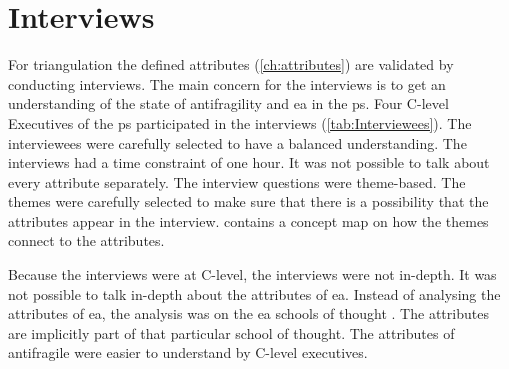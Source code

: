 \chapter{Interviews}
\label{ch:interviews}
For triangulation the defined \glspl{attribute} (\cref{ch:attributes}) are validated by conducting interviews. The main concern for the interviews is to get an understanding of the state of \gls{antifragility} and \acrshort{ea} in the \gls{ps}. Four C-level Executives of the \gls{ps} participated in the interviews (\cref{tab:Interviewees}). The interviewees were carefully selected to have a balanced understanding. The interviews had a time constraint of one hour. It was not possible to talk about every \gls{attribute} separately. The interview questions were theme-based. The themes were carefully selected to make sure that there is a possibility that the \glspl{attribute} appear in the interview.  contains a concept map on how the themes connect to the \glspl{attribute}.
\begin{table}[H]
	\centering
	\caption[Interviewees]{Interviewees}%
	\label{tab:Interviewees}%
\end{table}
Because the interviews were at C-level, the interviews were not in-depth. It was not possible to talk in-depth about the attributes of \acrshort{ea}. Instead of analysing the \glspl{attribute} of \acrshort{ea}, the analysis was on the \acrshort{ea} schools of thought \parencite{Lapalme2012}. The attributes are implicitly part of that particular school of thought. The attributes of \gls{antifragile} were easier to understand by C-level executives.

